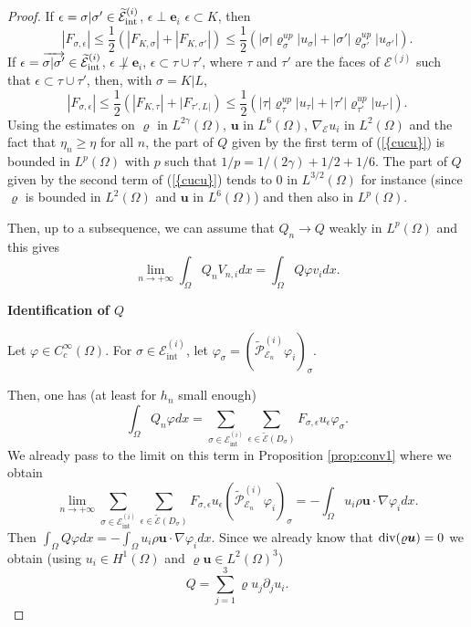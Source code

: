 \documentclass{amsart}
\numberwithin{equation}{section}
\begin{document}
\begin{proof}
If ${\epsilon} = {{\sigma}} | {{\sigma}}' \in{{{\widetilde {{\mathcal E}}}^{(i)}_{{\rm int}}}}$, ${\epsilon}\perp{{\boldsymbol e}}_{i}$ ${\epsilon} \subset K$, then
\[
| F_{{{\sigma}},{\epsilon}}| \le \frac 1 2 (|F_{K,{{\sigma}}}|+|F_{K,{{\sigma}}'}| )\le 
\frac 1 2 (|{{\sigma}}| {\varrho}_{{\sigma}}^{up} |u_{{\sigma}}| + |{{\sigma}}' | {\varrho}_{{{\sigma}}'}^{up} |u_{{{\sigma}}'}|).
\]
If ${\epsilon}= \overrightarrow{{{\sigma}} | {{\sigma}}'} \in{{{\widetilde {{\mathcal E}}}^{(i)}_{{\rm int}}}}$, ${\epsilon} \not\perp{{\boldsymbol e}}_{i}$, ${\epsilon} \subset {\tau}\cup{\tau}'$,
 where ${\tau}$ and ${\tau}'$ are the faces of ${\mathcal {E}^{(j)}}$ such that ${\epsilon} \subset {\tau} \cup {\tau}'$, then,
 with ${{\sigma}} =K|L$,
\[
| F_{{{\sigma}},{\epsilon}}| \le \frac 1 2 (|F_{K,{\tau}}|+ |F_{{\tau}',L|})\le 
\frac 1 2 (|{\tau}| {\varrho}_{\tau}^{up} |u_{\tau}| + |{\tau}' | {\varrho}_{{\tau}'}^{up} |u_{{\tau}'}|).
\]
Using the estimates on ${\varrho}$ in $L^{2{\gamma}}(\Omega)$, ${{\boldsymbol u}}$ in $L^6(\Omega)$, ${{\nabla}}_\operatorname{{\mathcal{E}}} u_i$ in $L^2(\Omega)$ and the fact
that $\eta_n \ge \eta$ for all $n$, the part of $Q$ given by the first term of {(\ref{{cucu}})} is bounded 
in $L^p(\Omega)$ with $p$ such that $1/p= 1/(2{\gamma}) + 1/2 + 1/6$.
The part of $Q$ given by the second term of {(\ref{{cucu}})} tends to $0$ in $L^{3/2}(\Omega)$ for instance (since ${\varrho}$ is bounded in $L^{2}(\Omega)$ and ${{\boldsymbol u}}$ in $L^6(\Omega)$) and then also in $L^p(\Omega)$.

Then, up to a subsequence, we can assume that $Q_n \to Q$ weakly in $L^p(\Omega)$ and this gives
\begin{equation}
\lim_{{n {\rightarrow} + \infty}}\int_\Omega Q_n V_{n,i}dx = \int_\Omega Q {\varphi} v_i dx.
\end{equation}

{\bf Identification of  $Q$}

Let ${\varphi} \in C_c^\infty(\Omega)$. 
For ${{\sigma}} \in {{\mathcal E}_{\mathrm{int}}^{(i)}}$, let ${\varphi}_{{\sigma}}=(\widetilde{\mathcal P}^{(i)}_{{{\mathcal E}}_n} \varphi_i)_{{\sigma}}$.

Then, one has (at least for $h_n$ small enough)
\[
\int_\Omega Q_n {\varphi} dx = \sum_{{{\sigma}} \in {{\mathcal E}_{\mathrm{int}}^{(i)}}} \sum_{{\epsilon} \in {\widetilde {{\mathcal E}}}(D_{{\sigma}})}
F_{{{\sigma}},{\epsilon}} u_{\epsilon} {\varphi}_{{\sigma}}.
\]
We already pass to the limit on this term in Proposition \ref{prop:conv1} where we obtain
\[
\lim_{{n {\rightarrow} + \infty}} \sum_{{{\sigma}} \in {{\mathcal E}_{\mathrm{int}}^{(i)}}} \sum_{{\epsilon} \in {\widetilde {{\mathcal E}}}(D_{{\sigma}})}
F_{{{\sigma}},{\epsilon}} u_{\epsilon}  (\widetilde{\mathcal P}^{(i)}_{{{\mathcal E}}_n} \varphi_i)_{{\sigma}}=
-\int_\Omega u_i \rho {{\boldsymbol u}} \cdot {{\nabla}} {\varphi}_i dx.
\]
Then $\int_\Omega Q {\varphi} dx = -\int_\Omega u_i \rho {{\boldsymbol u}} \cdot {{\nabla}} {\varphi}_i dx$.
Since we already know that ${{\rm div}} ( {\varrho} {{\boldsymbol u}})=0$ we obtain (using $u_i \in H^1(\Omega)$ and ${\varrho} {{\boldsymbol u}} \in L^2(\Omega)^3$)
\[
Q = \sum_{j=1}^3 {\varrho} u_j \partial_j u_i.
\]


\end{proof}
\end{document}
